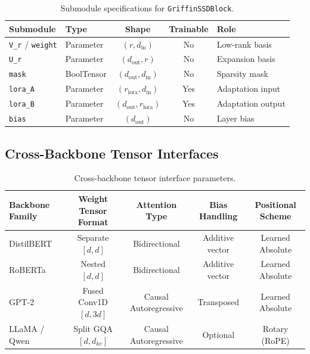 \begin{table}[H]
\centering
\small
\begin{tabular}{llccp{5cm}}
\toprule
\textbf{Submodule} & \textbf{Type} & \textbf{Shape} & \textbf{Trainable} & \textbf{Role} \\
\midrule
\texttt{V\_r} / \texttt{weight} & Parameter & $(r, d_{\text{in}})$ & No & Low-rank basis \\
\texttt{U\_r} & Parameter & $(d_{\text{out}}, r)$ & No & Expansion basis \\
\texttt{mask} & BoolTensor & $(d_{\text{out}}, d_{\text{in}})$ & No & Sparsity mask \\
\texttt{lora\_A} & Parameter & $(r_{\text{lora}}, d_{\text{in}})$ & Yes & Adaptation input \\
\texttt{lora\_B} & Parameter & $(d_{\text{out}}, r_{\text{lora}})$ & Yes & Adaptation output \\
\texttt{bias} & Parameter & $(d_{\text{out}})$ & No & Layer bias \\
\bottomrule
\end{tabular}
\caption{Submodule specifications for \texttt{GriffinSSDBlock}.}
\label{tab:submodules_griffinssd}
\end{table}

\subsection{Cross-Backbone Tensor Interfaces}
\begin{table}[H]
\centering
\small
\begin{tabular}{lcccc}
\toprule
\textbf{Backbone Family} & \textbf{Weight Tensor Format} & \textbf{Attention Type} & \textbf{Bias Handling} & \textbf{Positional Scheme} \\
\midrule
DistilBERT & Separate $[d, d]$ & Bidirectional & Additive vector & Learned Absolute \\
RoBERTa & Nested $[d, d]$ & Bidirectional & Additive vector & Learned Absolute \\
GPT-2 & Fused Conv1D $[d, 3d]$ & Causal Autoregressive & Transposed & Learned Absolute \\
LLaMA / Qwen & Split GQA $[d, d_{kv}]$ & Causal Autoregressive & Optional & Rotary (RoPE) \\
\bottomrule
\end{tabular}
\caption{Cross-backbone tensor interface parameters.}
\label{tab:backbone_interfaces}
\end{table}

